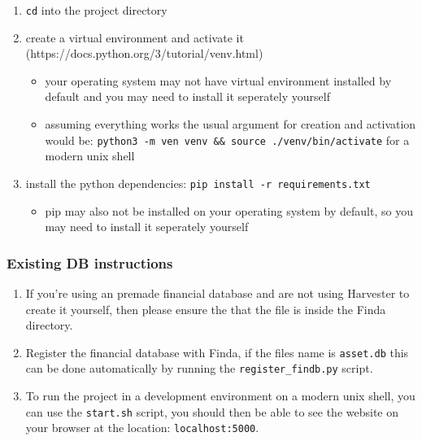 \documentclass[main.tex]{subfiles}
\begin{document}
\begin{enumerate}
\def\labelenumi{\arabic{enumi}.}

\item
  \texttt{cd} into the project directory
\item
  create a virtual environment and activate it
  (https://docs.python.org/3/tutorial/venv.html)

  \begin{itemize}

  \item
    your operating system may not have virtual environment installed by
    default and you may need to install it seperately yourself
  \item
    assuming everything works the usual argument for creation and
    activation would be:
    \texttt{python3\ -m\ ven\ venv\ \&\&\ source\ ./venv/bin/activate}
    for a modern unix shell
  \end{itemize}
\item
  install the python dependencies:
  \texttt{pip\ install\ -r\ requirements.txt}

  \begin{itemize}

  \item
    pip may also not be installed on your operating system by default,
    so you may need to install it seperately yourself
  \end{itemize}
\end{enumerate}

\subsubsection{Existing DB
instructions}\label{existing-db-instructions}

\begin{enumerate}
\def\labelenumi{\arabic{enumi}.}

\item
  If you're using an premade financial database and are not using
  Harvester to create it yourself, then please ensure the that the file
  is inside the Finda directory.
\item
  Register the financial database with Finda, if the files name is
  \texttt{asset.db} this can be done automatically by running the
  \texttt{register\_findb.py} script.
\item
  To run the project in a development environment on a modern unix
  shell, you can use the \texttt{start.sh} script, you should then be
  able to see the website on your browser at the location:
  \texttt{localhost:5000}.
\end{enumerate}
\end{document}
